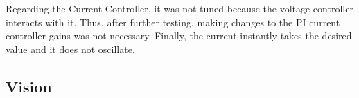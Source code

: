 \documentclass[a4paper]{article}
\begin{document}

Regarding the Current Controller, it was not tuned because the voltage controller
 interacts with it. Thus, after further testing, making changes to the PI current
  controller gains was not necessary. Finally, the current instantly takes the 
  desired value and it does not oscillate. 






\subsection{Vision}
\end{document}
